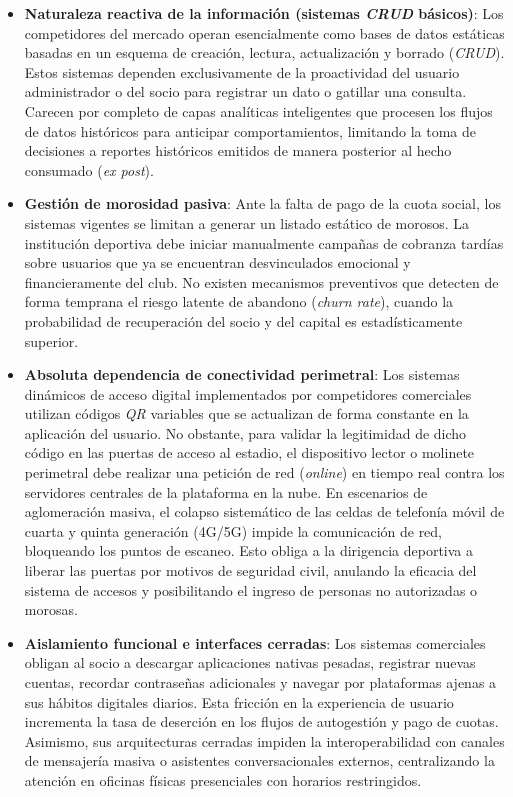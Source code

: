 \begin{itemize}
    \item \textbf{Naturaleza reactiva de la información (sistemas \textit{CRUD} básicos)}: Los competidores del mercado operan esencialmente como bases de datos estáticas basadas en un esquema de creación, lectura, actualización y borrado (\textit{CRUD}). Estos sistemas dependen exclusivamente de la proactividad del usuario administrador o del socio para registrar un dato o gatillar una consulta. Carecen por completo de capas analíticas inteligentes que procesen los flujos de datos históricos para anticipar comportamientos, limitando la toma de decisiones a reportes históricos emitidos de manera posterior al hecho consumado (\textit{ex post}).
    \item \textbf{Gestión de morosidad pasiva}: Ante la falta de pago de la cuota social, los sistemas vigentes se limitan a generar un listado estático de morosos. La institución deportiva debe iniciar manualmente campañas de cobranza tardías sobre usuarios que ya se encuentran desvinculados emocional y financieramente del club. No existen mecanismos preventivos que detecten de forma temprana el riesgo latente de abandono (\textit{churn rate}), cuando la probabilidad de recuperación del socio y del capital es estadísticamente superior.
    \item \textbf{Absoluta dependencia de conectividad perimetral}: Los sistemas dinámicos de acceso digital implementados por competidores comerciales utilizan códigos \textit{QR} variables que se actualizan de forma constante en la aplicación del usuario. No obstante, para validar la legitimidad de dicho código en las puertas de acceso al estadio, el dispositivo lector o molinete perimetral debe realizar una petición de red (\textit{online}) en tiempo real contra los servidores centrales de la plataforma en la nube. En escenarios de aglomeración masiva, el colapso sistemático de las celdas de telefonía móvil de cuarta y quinta generación (4G/5G) impide la comunicación de red, bloqueando los puntos de escaneo. Esto obliga a la dirigencia deportiva a liberar las puertas por motivos de seguridad civil, anulando la eficacia del sistema de accesos y posibilitando el ingreso de personas no autorizadas o morosas.
    \item \textbf{Aislamiento funcional e interfaces cerradas}: Los sistemas comerciales obligan al socio a descargar aplicaciones nativas pesadas, registrar nuevas cuentas, recordar contraseñas adicionales y navegar por plataformas ajenas a sus hábitos digitales diarios. Esta fricción en la experiencia de usuario incrementa la tasa de deserción en los flujos de autogestión y pago de cuotas. Asimismo, sus arquitecturas cerradas impiden la interoperabilidad con canales de mensajería masiva o asistentes conversacionales externos, centralizando la atención en oficinas físicas presenciales con horarios restringidos.

\end{itemize}
